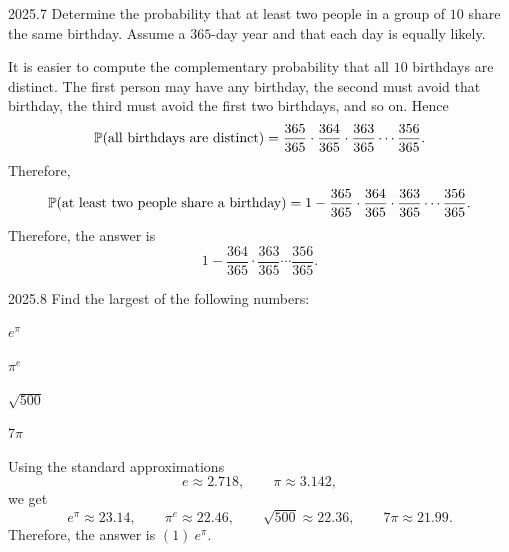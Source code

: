     \begin{pastproblem}{2025.7}
        Determine the probability that at least two people in a group of $10$ share the same
        birthday. Assume a $365$-day year and that each day is equally likely.
    \end{pastproblem}

    \begin{solution}
        It is easier to compute the complementary probability that all $10$ birthdays are distinct.
        The first person may have any birthday, the second must avoid that birthday, the third must
        avoid the first two birthdays, and so on. Hence
        \[
            \mathbb{P}(\text{all birthdays are distinct})
            =
            \frac{365}{365}\cdot\frac{364}{365}\cdot\frac{363}{365}\cdots\frac{356}{365}.
        \]
        Therefore,
        \[
            \mathbb{P}(\text{at least two people share a birthday})
            =
            1-\frac{365}{365}\cdot\frac{364}{365}\cdot\frac{363}{365}\cdots\frac{356}{365}.
        \]
        Therefore, the answer is
        \[
            \boxed{1-\frac{364}{365}\cdot\frac{363}{365}\cdots\frac{356}{365}}.
        \]
    \end{solution}

    \begin{pastproblem}{2025.8}
        Find the largest of the following numbers:
        \begin{problemchoices}
            \item \(e^\pi\)
            \item \(\pi^e\)
            \item \(\sqrt{500}\)
            \item $7\pi$
        \end{problemchoices}
    \end{pastproblem}

    \begin{solution}
        Using the standard approximations
        \[
            e\approx 2.718,
            \qquad
            \pi\approx 3.142,
        \]
        we get
        \[
            e^\pi \approx 23.14,
            \qquad
            \pi^e \approx 22.46,
            \qquad
            \sqrt{500} \approx 22.36,
            \qquad
            7\pi \approx 21.99.
        \]
        Therefore, the answer is $\boxed{(1)\ e^\pi}$.
    \end{solution}

